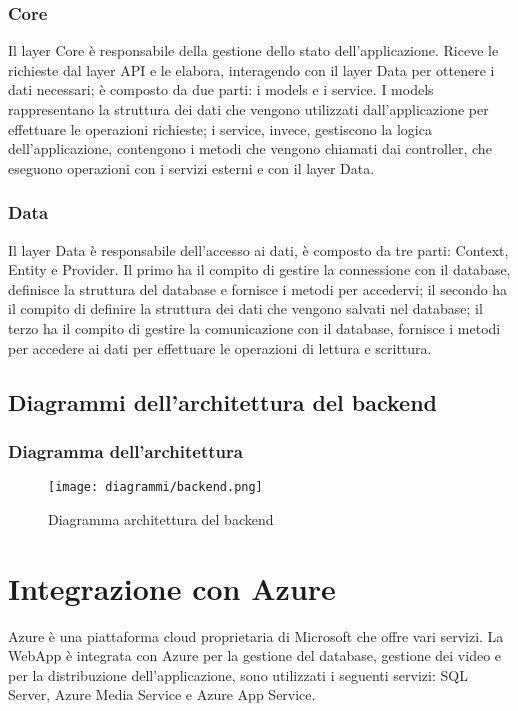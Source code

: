 \subsubsection{Core}
Il layer Core è responsabile della gestione dello stato dell'applicazione. Riceve le richieste dal layer API e le elabora, interagendo con il layer Data per ottenere i dati necessari; è composto da due parti: i models e i service. I models rappresentano la struttura dei dati che vengono utilizzati dall'applicazione per effettuare le operazioni richieste; i service, invece, gestiscono la logica dell'applicazione, contengono i metodi che vengono chiamati dai controller, che eseguono operazioni con i servizi esterni e con il layer Data.\\

\subsubsection{Data}
Il layer Data è responsabile dell'accesso ai dati, è composto da tre parti: Context, Entity e Provider. Il primo ha il compito di gestire la connessione con il database, definisce la struttura del database e fornisce i metodi per accedervi; il secondo ha il compito di definire la struttura dei dati che vengono salvati nel database; il terzo ha il compito di gestire la comunicazione con il database, fornisce i metodi per accedere ai dati per effettuare le operazioni di lettura e scrittura.\\

\subsection{Diagrammi dell'architettura del backend}
\subsubsection{Diagramma dell'architettura}
\begin{figure}[H] 
    \centering 
    \texttt{[image: diagrammi/backend.png]} 
    \caption{Diagramma architettura del backend}
\end{figure}

\section{Integrazione con Azure}
Azure è una piattaforma cloud proprietaria di Microsoft che offre vari servizi.
La WebApp è integrata con Azure per la gestione del database, gestione dei video e per la distribuzione dell'applicazione, sono utilizzati i seguenti servizi: SQL Server, Azure Media Service e Azure App Service.\\

